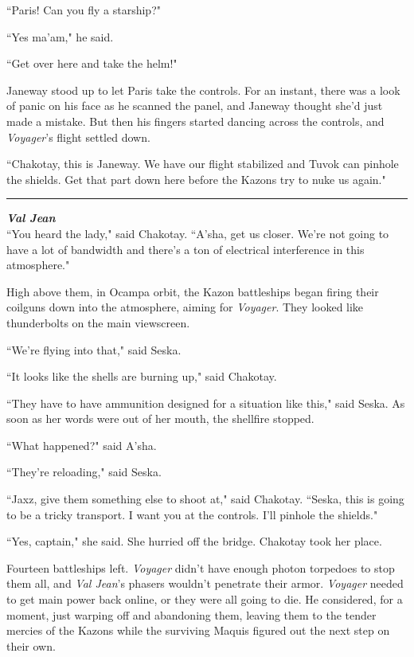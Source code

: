 \documentclass[twoside,letterpaper,12pt]{memoir}
\begin{document}
``Paris! Can you fly a starship?"

``Yes ma'am," he said.

``Get over here and take the helm!"

Janeway stood up to let Paris take the controls. For an instant, there was a look of panic on his face as he scanned the panel, and Janeway thought she'd just made a mistake. But then his fingers started dancing across the controls, and \textit{Voyager}'s flight settled down.

``Chakotay, this is Janeway. We have our flight stabilized and Tuvok can pinhole the shields. Get that part down here before the Kazons try to nuke us again."

\begin{center}\rule{3cm}{0.4 pt}\end{center}

\noindent\textit{\textbf{Val Jean}}\\

``You heard the lady," said Chakotay. ``A'sha, get us closer. We're not going to have a lot of bandwidth and there's a ton of electrical interference in this atmosphere."

High above them, in Ocampa orbit, the Kazon battleships began firing their coilguns down into the atmosphere, aiming for \textit{Voyager}. They looked like thunderbolts on the main viewscreen.

``We're flying into that," said Seska.

``It looks like the shells are burning up," said Chakotay.

``They have to have ammunition designed for a situation like this," said Seska. As soon as her words were out of her mouth, the shellfire stopped.

``What happened?" said A'sha.

``They're reloading," said Seska.

``Jaxz, give them something else to shoot at," said Chakotay. ``Seska, this is going to be a tricky transport. I want you at the controls. I'll pinhole the shields."

``Yes, captain," she said. She hurried off the bridge. Chakotay took her place.

Fourteen battleships left. \textit{Voyager} didn't have enough photon torpedoes to stop them all, and \textit{Val Jean}'s phasers wouldn't penetrate their armor. \textit{Voyager} needed to get main power back online, or they were all going to die. He considered, for a moment, just warping off and abandoning them, leaving them to the tender mercies of the Kazons while the surviving Maquis figured out the next step on their own.
\end{document}
